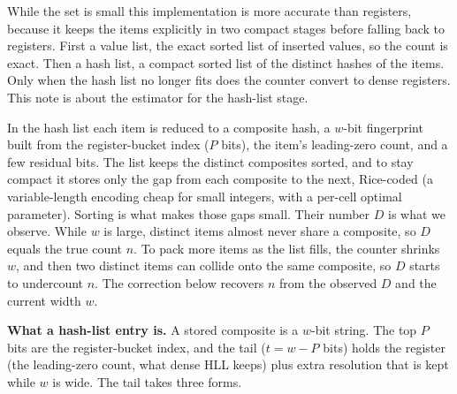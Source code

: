 \noindent While the set is small this implementation is more accurate than registers, because it keeps the items explicitly in two compact stages before falling back to registers. First a value list, the exact sorted list of inserted values, so the count is exact. Then a hash list, a compact sorted list of the distinct hashes of the items. Only when the hash list no longer fits does the counter convert to dense registers. This note is about the estimator for the hash-list stage.

\noindent In the hash list each item is reduced to a composite hash, a $w$-bit fingerprint built from the register-bucket index ($P$ bits), the item's leading-zero count, and a few residual bits. The list keeps the distinct composites sorted, and to stay compact it stores only the gap from each composite to the next, Rice-coded (a variable-length encoding cheap for small integers, with a per-cell optimal parameter). Sorting is what makes those gaps small. Their number $D$ is what we observe. While $w$ is large, distinct items almost never share a composite, so $D$ equals the true count $n$. To pack more items as the list fills, the counter shrinks $w$, and then two distinct items can collide onto the same composite, so $D$ starts to undercount $n$. The correction below recovers $n$ from the observed $D$ and the current width $w$.

\medskip
\noindent\textbf{What a hash-list entry is.} A stored composite is a $w$-bit string. The top $P$ bits are the register-bucket index, and the tail ($t=w-P$ bits) holds the register (the leading-zero count, what dense HLL keeps) plus extra resolution that is kept while $w$ is wide. The tail takes three forms.

